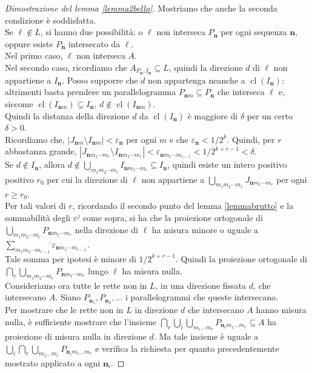 \documentclass[a4paper, twoside,openright]{article}
\newcommand{\e}{\varepsilon}
\newcommand{\<}{\langle}
\renewcommand{\>}{\rangle}
\begin{document}
\begin{proof}[Dimostrazione del lemma \ref{lemma2bello}]
Mostriamo che anche la seconda condizione è soddisfatta.\\
Se $\ell \notin L$, si hanno due possibilità: o $\ell$ non interseca $P_{\mathbf{n}}$ per ogni sequenza $\mathbf{n}$, oppure esiste $P_\mathbf{n}$ intersecato da $\ell$.\\
Nel primo caso, $\ell$ non interseca $A$.\\
Nel secondo caso, ricordiamo che $A_{P_\mathbf{n},I_\mathbf{n}} \subseteq L$, quindi la direzione $d$ di $\ell$ non appartiene a $I_{\mathbf{n}}$. Posso supporre che $d$ non appartenga neanche a $\operatorname{cl}(I_\mathbf{n})$: altrimenti basta prendere un parallelogramma $P_{\mathbf{n}m} \subseteq P_{\mathbf{n}}$ che interseca $\ell$ e, siccome $\operatorname{cl}(I_{\mathbf{n}m}) \subseteq I_{\mathbf{n}}$, $d \not \in \operatorname{cl}(I_{\mathbf{n}m})$.\\
Quindi la distanza della direzione $d$ da $\operatorname{cl}(I_\mathbf{n})$ è maggiore di $\delta$ per un certo $\delta >0$.\\
Ricordiamo che, $|J_{\mathbf{n}m} \setminus I_{\mathbf{n}m}| < \e_{\mathbf{n}}$ per ogni $m$ e che $\e_{\mathbf{n}} < 1/2^k$. Quindi, per $r$ abbastanza grande, $|J_{\mathbf{n} m_{1} \cdots m_{r}} \setminus I_{\mathbf{n} m_{1} \cdots m_{r}}| < \e_{\mathbf{n} m_{1} \cdots m_{r-1}} < 1/2^{k+r-1}<\delta$.\\
Se $d \not \in I_{\mathbf{n}} $, allora $d \not \in \bigcup_{m_{1} m_{2} \cdots m_{r}} I_{\mathbf{n} m_{1} \cdots m_{r}} \subseteq I_{\mathbf{n}}$, quindi esiste un intero positivo positivo $r_0$ per cui la direzione di $\ell$ non appartiene a $\bigcup_{m_{1} m_{2} \cdots m_{r}} J_{\mathbf{n} m_{1} \cdots m_{r}}$ per ogni $r \geq r_0$.\\
Per tali valori di $r$, ricordando il secondo punto del lemma \ref{lemmabrutto} e la sommabilità degli $\e^j$ come sopra, si ha che la proiezione ortogonale di $\bigcup_{m_{1} m_{2} \cdots m_{r}} P_{\mathbf{n} m_{1} \cdots m_{r}}$ nella direzione di $\ell$ ha misura minore o uguale a $\sum_{m_{1} m_{2} \cdots m_{r-1}} \varepsilon_{\mathbf{n} m_{1} \cdots m_{r-1}}$.\\
Tale somma per ipotesi è minore di $1/2^{k+r-1}$. Quindi la proiezione ortogonale di $\bigcap_{r} \bigcup_{m_{1} m_{2} \cdots m_{r}} P_{\mathbf{n} m_{1} \cdots m_{r}} $ lungo $\ell$ ha misura nulla.\\
Consideriamo ora tutte le rette non in $L$, in una direzione fissata $d$, che intersecano $A$. Siano $P_{\mathbf{n}_1}, P_{\mathbf{n}_2},...$ i parallelogrammi che queste intersecano.\\
Per mostrare che le rette non in $L$ in direzione $d$ che intersecano $A$ hanno misura nulla, è sufficiente mostrare che l'insieme $\bigcap_r \bigcup_i \bigcup_{m_1 ... m_r}  P_{\mathbf{n}_i m_{1} ...m_{r} } \subseteq A$ ha proiezione di misura nulla in direzione $d$. Ma tale insieme è uguale a $\bigcup_i \bigcap_r \bigcup_{m_1 ... m_r}  P_{\mathbf{n}_i m_{1} ...m_{r} }$ e verifica la richiesta per quanto precedentemente mostrato applicato a ogni $\mathbf{n}_i$.
\end{proof}
\end{document}
